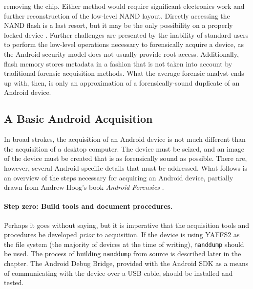 removing the chip.  Either method would require significant electronics work and further reconstruction of the low-level NAND
layout. Directly accessing the NAND flash is a last resort, but it may be the only possibility on a properly locked device
\cite{chipoff}.  Further challenges are presented by the inability of standard users to perform the low-level operations necessary
to forensically acquire a device, as the Android security model does not usually provide root access.  Additionally, flash memory
stores metadata in a fashion that is not taken into account by traditional forensic acquisition methods.  What the average forensic
analyst ends up with, then, is only an approximation of a forensically-sound duplicate of an Android device. 

\subsection{A Basic Android Acquisition}

In broad strokes, the acquisition of an Android device is not much different than the acquisition of a desktop computer. 
The device must be seized, and an image of the device must be created that is as forensically sound as possible.  There are,
however, several Android specific details that must be addressed.  What follows is an overview of the steps necessary for acquiring
an Android device, partially drawn from Andrew Hoog's book \emph{Android Forensics} \citeyear{hoog}.

\paragraph{Step zero: Build tools and document procedures.}
Perhaps it goes without saying, but it is imperative that the acquisition tools and procedures be developed \emph{prior} to
acquisition.  If the device is using YAFFS2 as the file system (the majority of devices at the time of writing), \texttt{nanddump}
should  be used.  The process of building \texttt{nanddump} from source is described later in the chapter.  The Android Debug
Bridge, provided with the Android SDK as a means of communicating with the device over a USB cable, should be installed and tested. 

